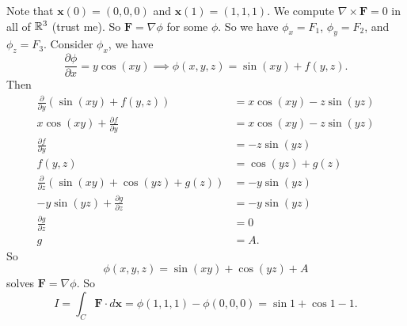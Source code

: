 \begin{solution}
    Note that $\bm x(0) = (0,0,0)$ and $\bm x(1) = (1,1,1)$.
    We compute $\nabla \times \bm F = 0$ in all of $\mathbb{R}^3$ (trust me).
    So $\bm F = \nabla \phi$ for some $\phi$.
    So we have $\phi_x = F_1$, $\phi_y = F_2$, and $\phi_z = F_3$.
    Consider $\phi_x$, we have
    \[
        \frac{\partial\phi}{\partial x} = y\cos(xy)
        \implies \phi(x,y,z) = \sin(xy) + f(y,z).
    \]
    Then
    \begin{align*}
        \frac{\partial}{\partial y} (\sin(xy) + f(y,z))
        &= x\cos(xy) - z\sin(yz) \\
        x\cos(xy) + \frac{\partial f}{\partial y}
        &= x\cos(xy) - z\sin(yz) \\
        \frac{\partial f}{\partial y}
        &= -z\sin(yz) \\
        f(y,z) 
        &= \cos(yz) + g(z) \\
        \frac{\partial}{\partial z} (\sin(xy) + \cos(yz) + g(z))
        &= -y\sin(yz) \\
        -y\sin(yz) + \frac{\partial g}{\partial z}
        &= -y\sin(yz) \\
        \frac{\partial g}{\partial z}
        &= 0 \\
        g &= A.
    \end{align*}
    So
    \[
        \phi(x,y,z) = \sin(xy) + \cos(yz) + A
    \]
    solves $\bm F = \nabla\phi$.
    So
    \[
        I = \int_C \bm F \cdot d\bm x 
        = \phi(1,1,1) - \phi(0,0,0) 
        = \sin 1 + \cos 1 - 1.
    \]
\end{solution}
